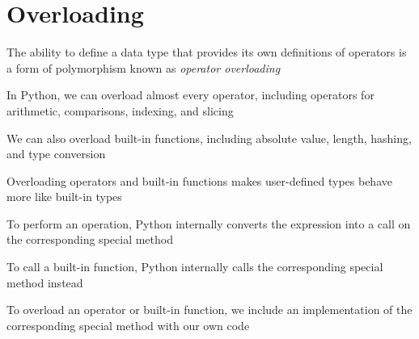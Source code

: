 \documentclass[8pt,a4paper,compress,handout]{beamer}
\begin{document}
\section{Overloading}
\begin{frame}[fragile]
The ability to define a data type that provides its own definitions of operators is a form of polymorphism known as \emph{operator overloading}

\bigskip

In Python, we can overload almost every operator, including operators for arithmetic, comparisons, indexing, and slicing

\bigskip

We can also overload built-in functions, including absolute value, length, hashing, and type conversion

\bigskip

Overloading operators and built-in functions makes user-defined types behave more like built-in types

\bigskip

To perform an operation, Python internally converts the expression into a call on the corresponding special method

\bigskip

To call a built-in function, Python internally calls the corresponding special method instead

\bigskip

To overload an operator or built-in function, we include an implementation of the corresponding special method with our own code
\end{frame}
\end{document}
